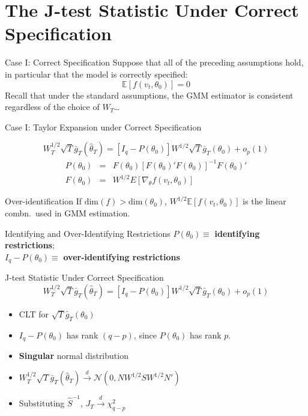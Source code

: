 \section{The J-test Statistic Under Correct Specification}
\begin{frame}{Case I: Correct Specification} 
  Suppose that all of the preceding assumptions hold, in particular that the model is \alert{correctly specified:}
  \[
    \mathbb{E}[f(v_t, \theta_0)] = 0
  \]
Recall that under the standard assumptions, the GMM estimator is consistent \alert{regardless of the choice of $W_T$\dots}
\end{frame}
\begin{frame}{Case I: Taylor Expansion under Correct Specification}

	$$W_T^{1/2} \sqrt{T} \bar{g}_T(\widehat{\theta}_T) = \left[I_q - P(\theta_0) \right]W^{1/2} \sqrt{T} \bar{g}_T(\theta_0) + o_p(1)$$
\footnotesize
\vspace{-2em}
	\begin{eqnarray*}
	P(\theta_0) &=& F(\theta_0) \left[F(\theta_0)' F(\theta_0) \right]^{-1} F(\theta_0)'\\
		F(\theta_0) &=& W^{1/2} E[\nabla_\theta f(v_t, \theta_0)]
	\end{eqnarray*}
  \normalsize

\begin{block}{Over-identification}
  If $\mbox{dim}(f) > \mbox{dim}(\theta_0)$, $W^{1/2} \mathbb{E}[f(v_t,\theta_0)]$ is the linear combn.\ used in GMM estimation.
\end{block}

\begin{block}{Identifying and Over-Identifying Restrictions}
$P(\theta_0) \equiv$ \textbf{identifying restrictions};\\ $I_q - P(\theta_0) \equiv$ \textbf{over-identifying restrictions}
\end{block}

\end{frame}
\begin{frame}{J-test Statistic Under Correct Specification}
	$$W_T^{1/2} \sqrt{T} \bar{g}_T(\widehat{\theta}_T) = \left[I_q - P(\theta_0) \right]W^{1/2} \sqrt{T} \bar{g}_T(\theta_0) + o_p(1)$$

  \begin{itemize}
    \item CLT for $\sqrt{T} \bar{g}_T(\theta_0)$
    \item $I_q - P(\theta_0)$ has rank $(q-p)$, since $P(\theta_0)$ has rank $p$.
    \item \textbf{Singular} normal distribution
	  \item $W_T^{1/2} \sqrt{T} \bar{g}_T(\widehat{\theta}_T) \overset{d}{\rightarrow} \mathcal{N}(0, NW^{1/2}S W^{1/2}N')$
    \item \alert{Substituting $\widehat{S}^{-1}$, $J_T \overset{d}{\rightarrow} \chi^2_{q-p}$}    
  \end{itemize}
\end{frame}
